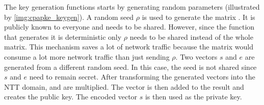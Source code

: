The key generation functions starts by generating random parameters (illustrated by \ref{img:cpapke_keygen}). A random seed $\rho$ is used to generate the matrix . It is publicly known to everyone and needs to be shared. However, since the function that generates it is deterministic only $\rho$ needs to be shared instead of the whole matrix. This mechanism saves a lot of network traffic because the matrix  would consume a lot more network traffic than just sending $\rho$. Two vectors $s$ and $e$ are generated from a different random seed. In this case, the seed is not shared since $s$ and $e$ need to remain secret. After transforming the generated vectors into the NTT domain,  and  are multiplied. The vector  is then added to the result and creates the public key. The encoded vector $s$ is then used as the private key.

